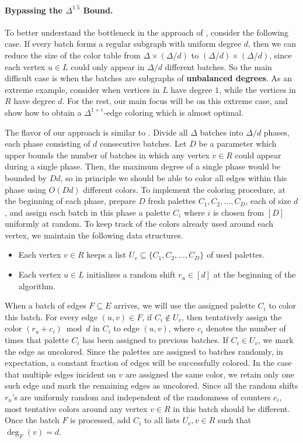 \documentclass[11pt,a4paper]{article}
\begin{document}
\paragraph*{Bypassing the $\Delta^{1.5}$ Bound.} To better understand the bottleneck in the approach of \cite{behnezhad2023streaming}, consider the following case. If every batch forms a regular subgraph with uniform degree $d$, then we can reduce the size of the color table from $\Delta\times (\Delta/d)$ to $(\Delta/d)\times (\Delta/d)$, since each vertex $u\in L$ could only appear in $\Delta/d$ different batches. So the main difficult case is when the batches are subgraphs of \textbf{unbalanced degrees}. As an extreme example, consider when vertices in $L$ have degree $1$, while the vertices in $R$ have degree $d$. For the rest, our main focus will be on this extreme case, and show how to obtain a $\Delta^{1+\epsilon}$-edge coloring which is almost optimal.

The flavor of our approach is similar to \cite{chechik_et_al:LIPIcs.ICALP.2024.40}. Divide all $\Delta$ batches into $\Delta / d$ phases, each phase consisting of $d$ consecutive batches. Let $D$ be a parameter which upper bounds the number of batches in which any vertex $v\in R$ could appear during a single phase. Then, the maximum degree of a single phase would be bounded by $Dd$, so in principle we should be able to color all edges within this phase using $O(Dd)$ different colors. To implement the coloring procedure, at the beginning of each phase, prepare $D$ fresh palettes $C_1, C_2, \ldots, C_{D}$, each of size $d$, and assign each batch in this phase a palette $C_i$ where $i$ is chosen from $[D]$ uniformly at random. To keep track of the colors already used around each vertex, we maintain the following data structures.
\begin{itemize}
	\item Each vertex $v\in R$ keeps a list $U_v\subseteq \{C_1, C_2, \ldots, C_D\}$ of used palettes.
	\item Each vertex $u\in L$ initializes a random shift $r_u\in [d]$ at the beginning of the algorithm.
\end{itemize} 

When a batch of edges $F\subseteq E$ arrives, we will use the assigned palette $C_i$ to color this batch. For every edge $(u, v)\in F$, if $C_i\notin U_v$, then tentatively assign the color $(r_u + c_i) \bmod d$ in $C_i$ to edge $(u, v)$, where $c_i$ denotes the number of times that palette $C_i$ has been assigned to previous batches. If $C_i \in U_v$, we mark the edge as uncolored. Since the palettes are assigned to batches randomly, in expectation, a constant fraction of edges will be successfully colored. In the case that multiple edges incident on $v$ are assigned the same color, we retain only one such edge and mark the remaining edges as uncolored. Since all the random shifts $r_u$'s are uniformly random and independent of the randomness of counters $c_i$, most tentative colors around any vertex $v\in R$ in this batch should be different. Once the batch $F$ is processed, add $C_i$ to all lists $U_v, v\in R$ such that $\deg_F(v) = d$.
\end{document}
